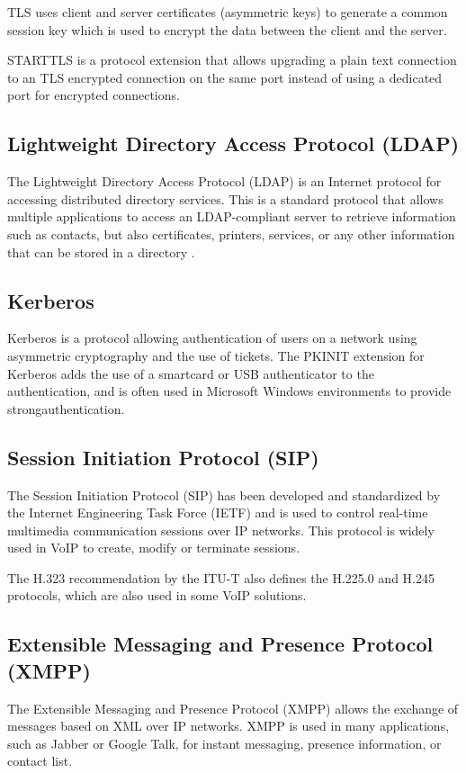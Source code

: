 TLS uses client and server certificates (asymmetric keys) to generate a common session key which is used to encrypt the data between the client and the server.

STARTTLS is a protocol extension that allows upgrading a plain text connection to an TLS encrypted connection on the same port instead of using a dedicated port for encrypted connections.


\subsection{Lightweight Directory Access Protocol (LDAP)}
The Lightweight Directory Access Protocol (LDAP) is an Internet protocol for accessing distributed directory services. This is a standard protocol that allows multiple applications to access an LDAP-compliant server to retrieve information such as contacts, but also certificates, printers, services, or any other information that can be stored in a directory
\cite{rfc4510}.

\subsection{Kerberos}

Kerberos is a protocol allowing authentication of users on a network using asymmetric cryptography and the use of tickets. The PKINIT extension for Kerberos adds the use of a smartcard or USB authenticator to the authentication, and is often used in Microsoft Windows environments to provide strong\linebreak[4]authentication\cite{rfc4120,rfc4556}.

\subsection{Session Initiation Protocol (SIP)}

The Session Initiation Protocol (SIP) has been developed and standardized by the Internet Engineering Task Force (IETF) and is used to control real-time multimedia communication sessions over IP networks. This protocol is widely used in VoIP to create, modify or terminate sessions\cite{rfc3261}.

The H.323 recommendation by the ITU-T also defines the H.225.0 and H.245 protocols, which are also used in some VoIP solutions\cite{dalgic_comparison_1999}.


\subsection{Extensible Messaging and Presence Protocol (XMPP)}
The Extensible Messaging and Presence Protocol (XMPP) allows the exchange of messages based on XML over IP networks. XMPP is used in many applications, such as Jabber or Google Talk, for instant messaging, presence information, or contact list\cite{rfc6120}.

